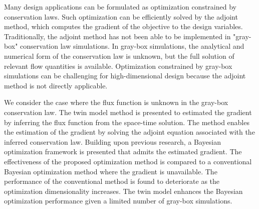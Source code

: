 % 
% 
%


Many design applications can be formulated as optimization constrained by conservation laws. Such optimization can be efficiently solved by the adjoint method, which computes the gradient of the objective to the design variables. Traditionally, the adjoint method has not been able to be implemented in "gray-box" conservation law simulations. In gray-box simulations, the analytical and numerical form of the conservation law is unknown, but the full solution of relevant flow quantities is available. Optimization constrained by gray-box simulations can be challenging for high-dimensional design because the adjoint method is not directly applicable.

We consider the case where the flux function is unknown in the gray-box conservation law. The twin model method is presented to estimated the gradient by inferring the flux function from the space-time solution. The method enables the estimation of the gradient by solving the adjoint equation associated with the inferred conservation law. Building upon previous research, a Bayesian optimization framework is presented that admits the estimated gradient. The effectiveness of the proposed optimization method is compared to a conventional Bayesian optimization method where the gradient is unavailable. The performance of the conventional method is found to deteriorate as the optimization dimensionality increases. The twin model enhances the Bayesian optimization performance given a limited number of gray-box simulations.

